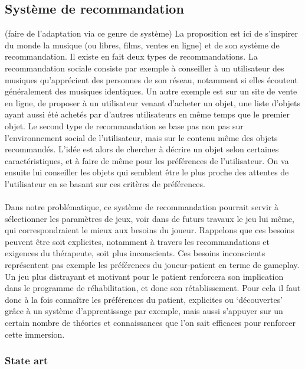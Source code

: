 	\subsection{Système de recommandation }
(faire de l'adaptation via ce genre de système)
La proposition est ici de s'inspirer du monde la musique (ou libres, films, ventes en ligne) et de son système de recommandation. Il existe en fait deux types de recommandations. La recommandation sociale consiste par exemple à conseiller à un utilisateur des musiques qu'apprécient des personnes de son réseau, notamment si elles écoutent généralement des musiques identiques. Un autre exemple est sur un site de vente en ligne, de proposer à un utilisateur venant d'acheter un objet, une liste d'objets ayant aussi été achetés par d'autres utilisateurs en même temps que le premier objet.
Le second type de recommandation se base pas non pas sur l'environnement social de l'utilisateur, mais sur le contenu même des objets recommandés. L'idée est alors de chercher à décrire un objet selon certaines caractéristiques, et à faire de même pour les préférences de l'utilisateur. On va ensuite lui conseiller les objets qui semblent être le plus proche des attentes de l'utilisateur en se basant sur ces critères de préférences. 
 \paragraph{}
 Dans notre problématique, ce système de recommandation pourrait servir à sélectionner les paramètres de jeux, voir dans de futurs travaux le jeu lui même, qui correspondraient le mieux aux besoins du joueur. Rappelons que ces besoins peuvent être soit explicites, notamment à travers les recommandations et exigences du thérapeute, soit plus inconscients. Ces besoins inconscients représentent pas exemple les préférences du joueur-patient en terme de gameplay. Un jeu plus distrayant et motivant pour le patient renforcera son implication dans le programme de réhabilitation, et donc son rétablissement. Pour cela il faut donc à la fois connaître les préférences du patient, explicites ou `découvertes'  grâce à un système d'apprentissage par exemple, mais aussi s'appuyer sur un certain nombre de théories et connaissances que l'on sait efficaces pour renforcer cette immersion. 		
 
 
 	\subsubsection{State art}

